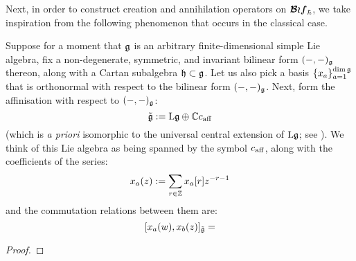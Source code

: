         Next, in order to construct creation and annihilation operators on $\boldsymbol{ \mathcal{Bos} }_{\hbar}$, we take inspiration from the following phenomenon that occurs in the classical case.
        \begin{remark} \label{remark: classical_heisenberg_degeneration}
            Suppose for a moment that $\mathfrak{g}$ is an arbitrary finite-dimensional simple Lie algebra, fix a non-degenerate, symmetric, and invariant bilinear form $(-, -)_{\mathfrak{g}}$ thereon, along with a Cartan subalgebra $\mathfrak{h} \subset \mathfrak{g}$. Let us also pick a basis $\{x_a\}_{a = 1}^{\dim \mathfrak{g}}$ that is orthonormal with respect to the bilinear form $(-, -)_{\mathfrak{g}}$. Next, form the affinisation with respect to $(-, -)_{\mathfrak{g}}$:
                $$\tilde{\mathfrak{g}} := \mathrm{L} \mathfrak{g} \oplus \mathbb{C} c_{\mathrm{aff}}$$
            (which is \textit{a priori} isomorphic to the universal central extension of $\mathrm{L} \mathfrak{g}$; see \cite{kassel_universal_central_extensions_of_lie_algebras}). We think of this Lie algebra as being spanned by the symbol $c_{\mathrm{aff}}$, along with the coefficients of the series:
                $$x_a(z) := \sum_{r \in \mathbb{Z}} x_a[r] z^{-r - 1}$$
            and the commutation relations between them are:
                $$[x_a(w), x_b(z)]_{\tilde{\mathfrak{g}}} = $$
        \end{remark}
        
        \begin{proposition}
            
        \end{proposition}
            \begin{proof}
                
            \end{proof}

